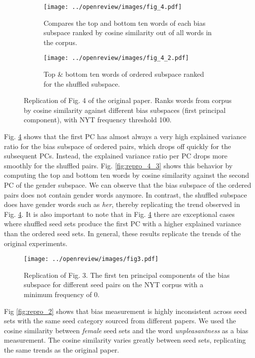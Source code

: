 \begin{figure}[ht]
	\centering
	\begin{subfigure}[b]{0.6\textwidth}
		\centering
		\texttt{[image: ../openreview/images/fig\_4.pdf]}
		\caption{Compares the top and bottom ten words of each bias subspace ranked by cosine similarity out of all words in the corpus.}
		\label{fig:repro_4_1}
	\end{subfigure}
	\hfill
	\begin{subfigure}[b]{0.33\textwidth}
		\centering
		\texttt{[image: ../openreview/images/fig\_4\_2.pdf]}
		\caption{Top \& bottom ten words of ordered subspace ranked for the shuffled subspace.}
		\label{fig:repro_4_2}
	\end{subfigure}
	\caption{Replication of Fig. 4 of the original paper. Ranks words from corpus by cosine similarity against different bias subspaces (first principal component), with NYT frequency threshold 100.}
	\label{fig:repro_4}
\end{figure}

Fig. \ref{fig:repro_3} shows that the first PC has almost always a very high explained variance
ratio for the bias subspace of ordered pairs, which drops off quickly for the subsequent PCs.
Instead, the explained variance ratio per PC drops more smoothly for the shuffled pairs. Fig.
\ref{fig:repro_4_3} shows this behavior by computing the top and bottom ten words by cosine
similarity against the second PC of the gender subspace. We can observe that the bias subspace of
the ordered pairs does not contain gender words anymore. In contrast, the shuffled subspace does
have gender words such as \textit{her}, thereby replicating the trend observed in Fig.
\ref{fig:repro_3}. It is also important to note that in Fig. \ref{fig:repro_3} there are exceptional
cases where shuffled seed sets produce the first PC with a higher explained variance than the
ordered seed sets. In general, these results replicate the trends of the original experiments.

\begin{figure}[ht]
	\centering
	\texttt{[image: ../openreview/images/fig3.pdf]}
	\caption{Replication of Fig. 3. The first ten principal components of the bias subspace for different seed pairs on the NYT corpus with a minimum frequency of 0.}
	\label{fig:repro_3}
\end{figure}

Fig \ref{fig:repro_2} shows that bias measurement is highly inconsistent across seed sets with the
same seed category sourced from different papers. We used the cosine similarity between
\textit{female} seed sets and the word \textit{unpleasantness} as a bias measurement. The cosine
similarity varies greatly between seed sets, replicating the same trends as the original paper.

